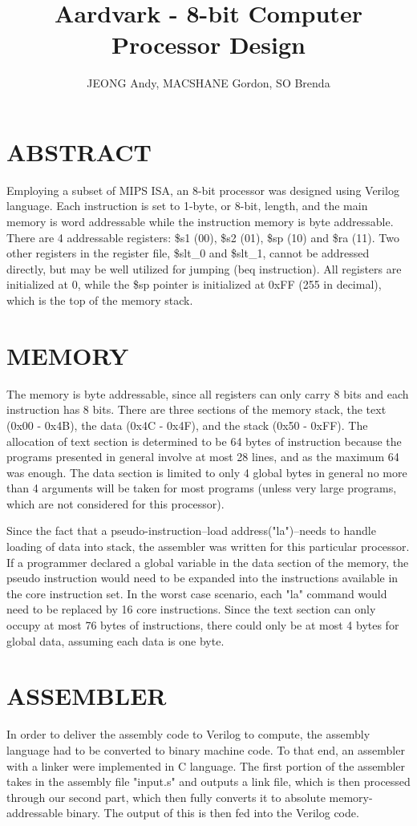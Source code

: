 \documentclass[11pt, titlepage]{article}
\author{JEONG Andy, MACSHANE Gordon, SO Brenda}
\title{Aardvark - 8-bit Computer Processor Design}
\date{\parbox{\linewidth}{}}
\begin{document}
\maketitle
\tableofcontents
\newpage
\setcounter{tocdepth}{1}
\section{ABSTRACT}
Employing a subset of MIPS ISA, an 8-bit processor was designed  using Verilog language. Each instruction is set to 1-byte, or 8-bit, length, and the main memory is word addressable while the instruction memory is byte addressable. There are 4 addressable registers: \$s1 (00), \$s2 (01), \$sp (10) and \$ra (11). Two other registers in the register file, \$slt\_0 and \$slt\_1, cannot be addressed directly, but may be well utilized for jumping (beq instruction). All registers are initialized at 0, while the \$sp pointer is initialized at 0xFF (255 in decimal), which is the top of the memory stack. 
\newpage

\section{MEMORY}
The memory is byte addressable, since all registers can only carry 8 bits and each instruction has 8 bits. There are three sections of the memory stack, the text (0x00 - 0x4B), the data (0x4C - 0x4F), and the stack (0x50 - 0xFF). The allocation of text section is determined to be 64 bytes of instruction because the programs presented in general involve at most 28 lines, and as the maximum 64 was enough. The data section is limited to only 4 global bytes in general no more than 4 arguments will be taken for most programs (unless very large programs, which are not considered for this processor). 

\par Since the fact that a pseudo-instruction--load address("la")--needs to handle loading of data into stack, the assembler was written for this particular processor. If a programmer declared a global variable in the data section of the memory, the pseudo instruction would need to be expanded into the instructions available in the core instruction set. In the worst case scenario, each "la" command would need to be replaced by 16 core instructions. Since the text section can only occupy at most 76 bytes of instructions, there could only be at most 4 bytes for global data, assuming each data is one byte. 

\section{ASSEMBLER}
In order to deliver the assembly code to Verilog to compute, the assembly language had to be converted to binary machine code. To that end, an assembler with a linker were implemented in C language. The first portion of the assembler takes in the assembly file "input.s" and outputs a link file, which is then processed through our second part, which then fully converts it to absolute memory-addressable binary. The output of this is then fed into the Verilog code.
\end{document}
